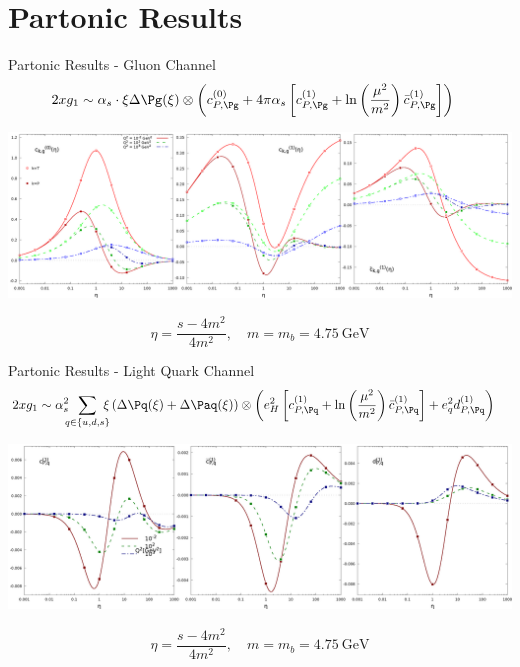 \section{Partonic Results}
\begin{frame}{Partonic Results - Gluon Channel}
\begin{align*}
2xg_1 &\sim \alpha_s\cdot\xi\Delta \Pg(\xi) \otimes \left(c_{P,\Pg}^{(0)} + 4\pi\alpha_s\left[c_{P,\Pg}^{(1)} + \ln\left(\frac{\mu^2}{m^2}\right)\bar c_{P,\Pg}^{(1)}\right]\right)
\end{align*}
\begin{center}
\includegraphics[width=\textwidth]{img/cgTP}
\end{center}
\[\eta = \frac{s-4m^2}{4m^2},\quad m=m_b=\SI{4.75}{\GeV}\]
\end{frame}

\begin{frame}{Partonic Results - Light Quark Channel}
\begin{align*}
2xg_1 &\sim \alpha_s^2\!\!\!\sum_{q\in\{u,d,s\}}\!\!\!\!\xi\left(\Delta \Pq(\xi)+\Delta \Paq(\xi)\right) \otimes \left(e_H^2\left[c_{P,\Pq}^{(1)} + \ln\left(\frac{\mu^2}{m^2}\right)\bar c_{P,\Pq}^{(1)}\right] + e_q^2 d_{P,\Pq}^{(1)}\right)
\end{align*}
\begin{center}
\includegraphics[width=\textwidth]{img/cdqP}
\end{center}
\[\eta = \frac{s-4m^2}{4m^2},\quad m=m_b=\SI{4.75}{\GeV}\]
\end{frame}
